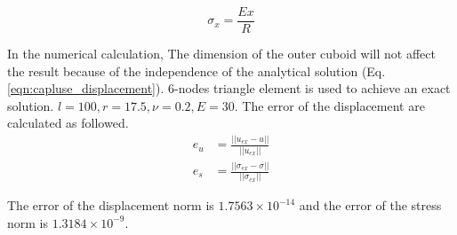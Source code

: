 \begin{equation}
  \sigma_x = \frac{Ex}{R}
  \label{eqn:caplus_stress}
\end{equation}

In the numerical calculation, The dimension of the outer cuboid will not affect the result because of the independence of the analytical solution (Eq.\ref{eqn:capluse_displacement}). 6-nodes triangle element is used to achieve an exact solution. $l=100,r=17.5,\nu=0.2,E=30$. The error of the displacement are calculated as followed.
\begin{subequations}
\begin{align}
e_u &= \frac{||u_{ex} - u||}{||u_{ex}||}\\
e_s &= \frac{||\sigma_{ex} - \sigma||}{||\sigma_{ex}||}
\end{align}
\end{subequations}

The error of the displacement norm is $1.7563\times 10^{-14}$ and the error of the stress norm is $1.3184\times 10^{-9}$.
